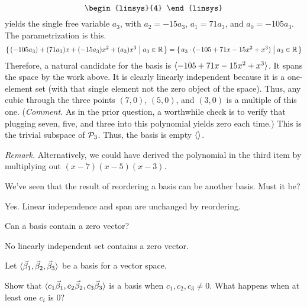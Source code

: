 \begin{exercises}
\begin{answer}
\begin{exparts}
\begin{equation*}
\begin{linsys}{4}
            \end{linsys}
          \end{equation*}
          yields the single free variable $a_3$, with 
          $a_2=-15a_3$, $a_1=71a_3$, and $a_0=-105a_3$.
          The parametrization is this.
          \begin{equation*} 
            \mbox{$\{\,(-105a_3)+(71a_3)x+(-15a_3)x^2+(a_3)x^3\bigm| a_3\in\mathbb{R}\,\}$}=
            \mbox{$\{\,a_3\cdot(-105+71x-15x^2+x^3)\bigm| a_3\in\mathbb{R}\,\}$}
          \end{equation*}
          Therefore, a natural candidate for the basis is 
          $\langle-105+71x-15x^2+x^3\rangle$.
          It spans the space by the work above.
          It is clearly linearly independent because it is a one-element
          set (with that single element not the zero object of the space).
          Thus, any cubic through the three points $(7,0)$, $(5,0)$, and
          $(3,0)$ is a multiple of this one.
          (\textit{Comment.}
          As in the prior question, 
          a worthwhile check is to verify that plugging seven, five, and
          three into this polynomial yields zero each time.)
        \partsitem This is the trivial subspace of $\mathcal{P}_3$.
          Thus, the  basis is empty $\langle\rangle$.
      \end{exparts}
      \noindent\textit{Remark.}
      Alternatively, we could have derived the polynomial in the third item
      by multiplying out $(x-7)(x-5)(x-3)$.
     \end{answer}
  \item 
     We've seen that the result of reordering a basis can be another basis.
     Must it be? 
     \begin{answer}
       Yes.
       Linear independence and span are unchanged by reordering.
     \end{answer}
  \item  
    Can a basis contain a zero vector?
    \begin{answer}
      No linearly independent set contains a zero vector.  
    \end{answer}
  \recommended \item
    Let \( \langle\vec{\beta}_1,\vec{\beta}_2,\vec{\beta}_3\rangle \)
    be a basis for a vector space.
    \begin{exparts}
      \partsitem Show that 
        \( \langle c_1\vec{\beta}_1,c_2\vec{\beta}_2,c_3\vec{\beta}_3\rangle \)
        is a basis when \( c_1, c_2, c_3\neq 0 \).
        What happens when at least one \( c_i \) is $0$?

\end{exparts}
\end{exercises}
